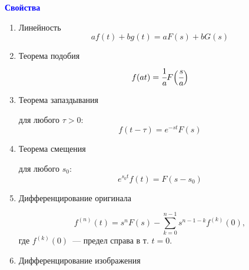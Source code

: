 
    

\textbf{\textcolor{blue}{Свойства}}

\begin{enumerate}
    \item Линейность
        \begin{equation}
            a f(t) + b g(t) = a F(s) + b G(s)
        \end{equation}
    \item Теорема подобия
        \begin{equation}
            f(at) = \cfrac{1}{a} F\Big(\cfrac{s}{a}\Big)
        \end{equation}
    \item Теорема запаздывания

        для любого $\tau>0$:
        \begin{equation}
            f(t-\tau) = e^{-st} F(s)
        \end{equation}

    \item Теорема смещения

        для любого $s_0$:
        \begin{equation}
            e^{s_0 t} f(t) = F(s - s_0)
        \end{equation}
    
    \item Дифференцирование оригинала
    
        \begin{equation}
            f^{(n)}(t) = s^n F(s) - \sum\limits_{k=0}^{n-1} s^{n-1-k} f^{(k)}(0),
        \end{equation}
        где $f^{(k)}(0)$~--- предел справа в т. $t=0$.
        
    \item Дифференцирование изображения
        

\end{enumerate}
